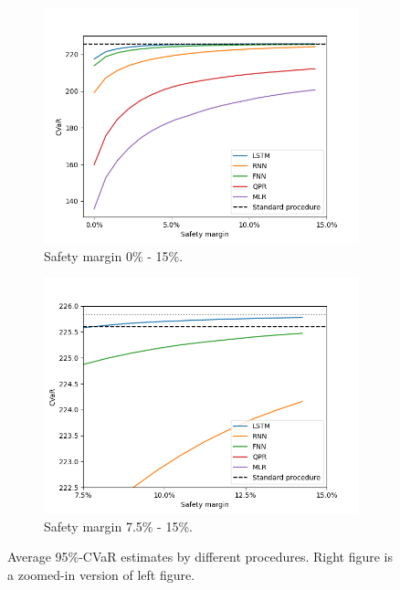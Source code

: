 \documentclass{article}
\begin{document}
\begin{figure}[ht!]
    \centering
    \begin{subfigure}{0.48\textwidth}
        \includegraphics[width=\textwidth]{./figures/CVaR/allLN.png}
        \caption{Safety margin 0\% - 15\%.}
        \label{subfig:AllSafetyMargin}
    \end{subfigure}
    \begin{subfigure}{0.48\textwidth}
        \includegraphics[width=\textwidth]{./figures/CVaR/zoomedLN.png}
        \caption{Safety margin 7.5\% - 15\%.}
        \label{subfig:ZoomedSafetyMargin}
    \end{subfigure}
    \caption{Average 95\%-CVaR estimates by different procedures. Right figure is a zoomed-in version of left figure.} 
    \label{fig:CVaR95}
\end{figure}
\end{document}
